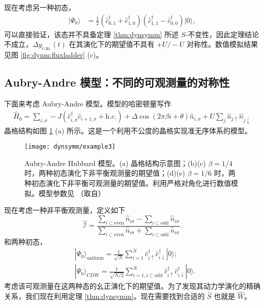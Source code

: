 现在考虑另一种初态，
\begin{align}\label{eq:state2}
|\Psi_0\rangle&=\frac{1}{2}(\hat{c}^\dag_{0,1}+\hat{c}^\dag_{1,0})(\hat{c}^\dag_{1,1}-\hat{c}^\dag_{0,0})|0\rangle,
\end{align}
可以直接验证，该态并不具备定理 \ref{thm:dynsymm} 所述 $S$-不变性，因此定理结论不成立，$\Delta y_{\text{c.m.}}(t)$ 在其演化下的期望值不具有 $+U/-U$ 对称性。数值模拟结果见图 \ref{fig:dynm:fluxladder} (c)。




\subsection{Aubry-Andre 模型：不同的可观测量的对称性}
下面来考虑 Aubry-Andre 模型。模型的哈密顿量写作
\begin{align}
\hat{H}_0=\sum\limits_{i,\sigma}-J(\hat{c}^\dag_{i,\sigma}\hat{c}_{i+1,\sigma}+\text{h.c.})+\Delta\cos(2\pi\beta i+\theta)\hat{n}_{i,\sigma} + U\sum_j\hat{n}_{j\uparrow}\hat{n}_{j\downarrow}
\end{align}
晶格结构如图 \ref{fig:dynm:aa} (a) 所示。这是一个利用不公度的晶格实现准无序体系的模型\cite{mbl1d}。
\begin{figure}[!htb]
\centering
\texttt{[image: dynsymm/example3]}
\caption{Aubry-Andre Hubbard 模型。(a) 晶格结构示意图；(b)(c) $\beta=1/4$ 时，两种初态演化下非平衡观测量的期望值；(d)(e) $\beta=1/6$ 时，两种初态演化下非平衡可观测量的期望值。利用严格对角化进行数值模拟。模型参数见 （取自）}
\label{fig:dynm:aa}
\end{figure}

现在考虑一种非平衡观测量\cite{mbl1d}，定义如下
\begin{equation}
\hat{\mathcal{I}}=\frac{\sum_{i\subset \text{even}}\hat{n}_{i\sigma}-\sum_{i\subset \text{odd}}\hat{n}_{i\sigma}}{\sum_{i\subset \text{even}}\hat{n}_{i\sigma}+\sum_{i\subset \text{odd}}\hat{n}_{i\sigma}}.
\end{equation}
和两种初态，
\begin{align}
&|\Psi_0\rangle_{\text{uniform}}=\frac{1}{\sqrt{N}}\sum\limits_{i=1}^{N}\hat{c}^\dag_{i\uparrow}\hat{c}^\dag_{i\downarrow}|0\rangle;\\
&|\Psi_0\rangle_{\text{CDW}}=\frac{1}{\sqrt{N/2}}\sum\limits_{i=1,i\subset \text{odd}}^{N}\hat{c}^\dag_{i\uparrow}\hat{c}^\dag_{i\downarrow}|0\rangle.
\end{align}
考虑该可观测量在这两种态的幺正演化下的期望值。为了发现其动力学演化的精确关系，我们现在利用定理 \ref{thm:dynsymm}。现在需要找到合适的 $\hat{S}$ 也就是 $\hat{W}$。

